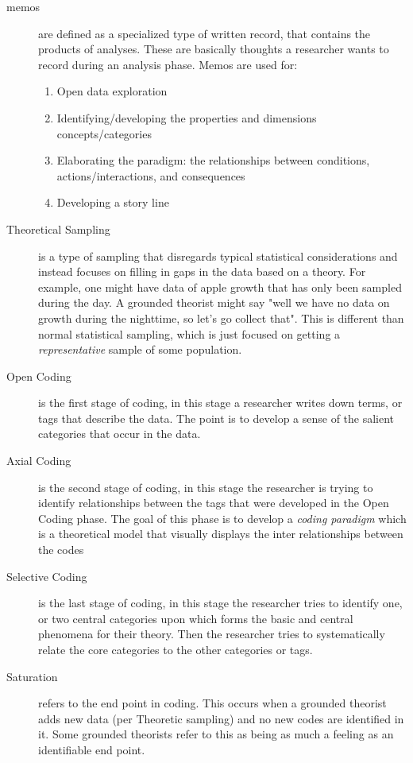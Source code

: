\documentclass[10pt, letterpaper]{article}
\begin{document}
\begin{description}
\item[{memos}] are defined as a specialized type of written record, that contains
the products of analyses. These are basically thoughts a researcher
wants to record during an analysis phase. Memos are used for:
\begin{enumerate}
\item Open data exploration
\item Identifying/developing the properties and dimensions
concepts/categories
\item Elaborating the paradigm: the relationships between conditions,
actions/interactions, and consequences
\item Developing a story line
\end{enumerate}

\item[{Theoretical Sampling}] is a type of sampling that disregards typical
statistical considerations and instead focuses on filling in gaps in the
data based on a theory. For example, one might have data of apple growth
that has only been sampled during the day. A grounded theorist might say
"well we have no data on growth during the nighttime, so let's go collect
that". This is different than normal statistical sampling, which is just
focused on getting a \emph{representative} sample of some population.

\item[{Open Coding}] is the first stage of coding, in this stage a researcher
writes down terms, or tags that describe the data. The point
is to develop a sense of the salient categories that occur in
the data.

\item[{Axial Coding}] is the second stage of coding, in this stage the researcher
is trying to identify relationships between the tags that
were developed in the Open Coding phase. The goal of this
phase is to develop a \emph{coding paradigm} which is a
theoretical model that visually displays the inter
relationships between the codes

\item[{Selective Coding}] is the last stage of coding, in this stage the
researcher tries to identify one, or two central categories upon which
forms the basic and central phenomena for their theory. Then the
researcher tries to systematically relate the core categories to the
other categories or tags.

\item[{Saturation}] refers to the end point in coding. This occurs when a grounded
theorist adds new data (per Theoretic sampling) and no new
codes are identified in it. Some grounded theorists refer to
this as being as much a feeling as an identifiable end point.
\end{description}
\end{document}
